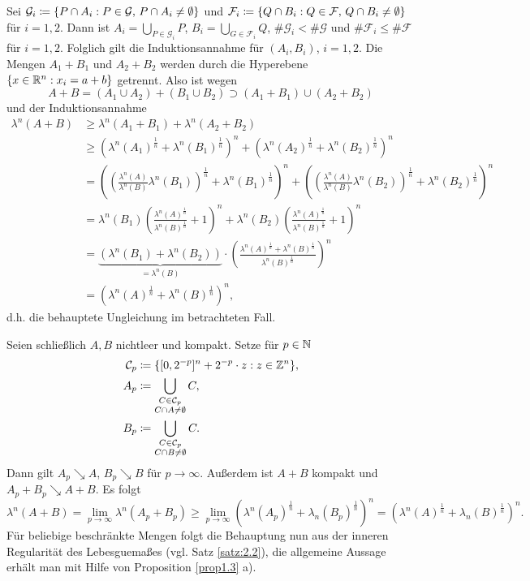 \documentclass[a4paper,twoside,DIV15,BCOR12mm]{scrbook}
\DeclareMathOperator{\downto}{\searrow}
\begin{document}
\begin{beweis}
Sei $\mathcal G_i \da \{P \cap A_i: P\in\mathcal G,\, P\cap A_i\ne \emptyset\}$ und $\mathcal F_i \da \{Q \cap B_i: Q\in\mathcal F,\, Q\cap B_i\ne \emptyset\}$ für $i=1,2$. Dann ist $A_i = \bigcup_{P\in \mathcal G_i}P$, $B_i = \bigcup_{G\in \mathcal F_i}Q$, $\#\mathcal G_i < \#\mathcal G$ und $\#\mathcal F_i \le \#\mathcal F$ für $i=1,2$. Folglich gilt die Induktionsannahme für $(A_i,B_i)$, $i=1,2$. Die Mengen $A_1 + B_1$ und $A_2+B_2$ werden durch die Hyperebene $\{x\in\mathbb{R}^n: x_i = a+b\}$ getrennt. Also ist wegen
\[
A+B = (A_1\cup A_2) + (B_1\cup B_2) \supset (A_1 + B_1) \cup (A_2 + B_2)
\]
und der Induktionsannahme
\begin{align*}
\lambda^n(A+B)
&\ge \lambda^n(A_1+B_1) + \lambda^n(A_2+B_2) \\
&\ge \left(\lambda^n(A_1)^{\frac 1n} + \lambda^n(B_1)^{\frac 1n}\right)^n + \left(\lambda^n(A_2)^{\frac 1n} + \lambda^n(B_2)^{\frac 1n}\right)^n \\
&= \left(\left(\frac{\lambda^n(A)}{\lambda^n(B)}\lambda^n(B_1)\right)^{\frac 1n} + \lambda^n(B_1)^{\frac 1n}\right)^n + \left(\left(\frac{\lambda^n(A)}{\lambda^n(B)}\lambda^n(B_2)\right)^{\frac 1n} + \lambda^n(B_2)^{\frac 1n}\right)^n\\
&= \lambda^n(B_1)\left( \frac{\lambda^n(A)^{\frac 1n}}{\lambda^n(B)^{\frac 1n}} + 1 \right)^n +\lambda^n(B_2)\left( \frac{\lambda^n(A)^{\frac 1n}}{\lambda^n(B)^{\frac 1n}} + 1 \right)^n\\
&= \underbrace{(\lambda^n(B_1) + \lambda^n(B_2))}_{=\lambda^n(B)} \cdot \left( \frac{\lambda^n(A)^{\frac 1n} + \lambda^n(B)^{\frac 1n}}{\lambda^n(B)^{\frac 1n}}\right)^n \\
&= \left( \lambda^n(A)^{\frac1n} + \lambda^n(B)^{\frac1n} \right)^n,
\end{align*}
d.h. die behauptete Ungleichung im betrachteten Fall.

Seien schließlich $A,B$ nichtleer und kompakt. Setze für $p\in\mathbb{N}$
\begin{align*}
\mathcal C_p &\da \{[0,2^{-p}]^n + 2^{-p}\cdot z : z\in\MdZ^n\}, \\
A_p &\da \bigcup_{\substack{C\in\mathcal C_p \\ C\cap A \ne \emptyset}} C, \\
B_p &\da \bigcup_{\substack{C\in\mathcal C_p \\ C\cap B \ne \emptyset}} C.
\end{align*}
Dann gilt $A_p \downto A$, $B_p \downto B$ für $p\to\infty$. Außerdem ist $A+B$ kompakt und $A_p + B_p \downto A+ B$. Es folgt
\[
\lambda^n(A+B) = \lim_{p\to\infty} \lambda^n(A_p + B_p) 
\ge \lim_{p\to\infty} \left( \lambda^n(A_p)^{\frac 1n} + \lambda_n(B_p)^{\frac1n} \right)^n
=  \left( \lambda^n(A)^{\frac 1n} + \lambda_n(B)^{\frac1n} \right)^n.
\]
Für beliebige beschränkte Mengen folgt die Behauptung nun aus der inneren Regularität 
des Lebesguemaßes (vgl. Satz \ref{satz:2.2}), die allgemeine Aussage erhält man 
mit Hilfe von Proposition \ref{prop1.3} a).
\end{beweis}
\end{document}
